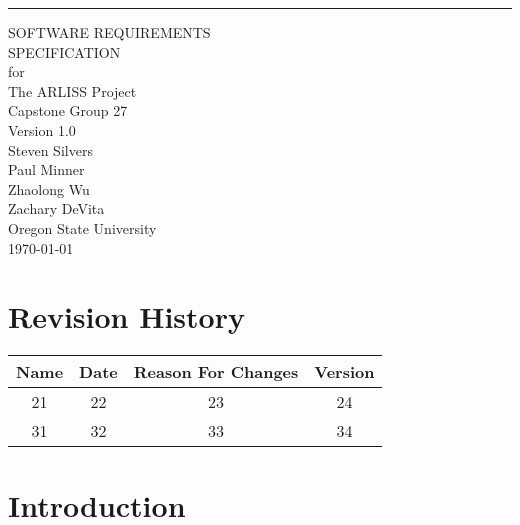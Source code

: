 \documentclass{scrreprt}
\date{}
\def\myversion{1.0 }
\begin{document}

\begin{flushright}
    \rule{16cm}{5pt}\vskip1cm
    \begin{bfseries}
        \Huge{SOFTWARE REQUIREMENTS\\ SPECIFICATION}\\
        \vspace{1.9cm}
        for\\
        \vspace{1.9cm}
        The ARLISS Project\\
        \vspace{1.5cm}
        \LARGE{Capstone Group 27}\\
        
        \LARGE{Version \myversion}\\
        \vspace{1.7cm}
        	Steven Silvers\\
	Paul Minner\\
        	Zhaolong Wu\\
	Zachary DeVita\\
        \vspace{1.5cm}
        Oregon State University\\
        
        \today\\
	\vspace{1.9cm}
    \end{bfseries}
\end{flushright}

\tableofcontents
{}

\chapter*{Revision History}

\begin{center}
    \begin{tabular}{|c|c|c|c|}
        \hline
	    Name & Date & Reason For Changes & Version\\
        \hline
	    21 & 22 & 23 & 24\\
        \hline
	    31 & 32 & 33 & 34\\
        \hline
    \end{tabular}
\end{center}

\chapter{Introduction}
\end{document}

